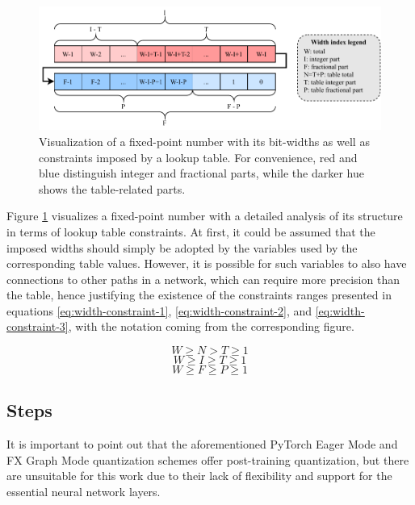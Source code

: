\begin{figure}[hpt!]
  \centering
  \includegraphics[trim={0cm 0cm 0cm 0cm}, width=1.0\textwidth, center]{quantization/width_constraints.pdf}
  \caption{Visualization of a fixed-point number with its bit-widths as well as constraints imposed by a lookup table. For convenience, red and blue distinguish integer and fractional parts, while the darker hue shows the table-related parts.}
  \label{fig:width-constraints}
\end{figure}

Figure \ref{fig:width-constraints} visualizes a fixed-point number with a detailed analysis of its structure in terms of lookup table constraints. At first, it could be assumed that the imposed widths should simply be adopted by the variables used by the corresponding table values. However, it is possible for such variables to also have connections to other paths in a network, which can require more precision than the table, hence justifying the existence of the constraints ranges presented in equations \ref{eq:width-constraint-1}, \ref{eq:width-constraint-2}, and \ref{eq:width-constraint-3}, with the notation coming from the corresponding figure.

\begin{equation} \label{eq:width-constraint-1}
  W \geqslant N > T \geqslant 1
\end{equation}
\begin{equation} \label{eq:width-constraint-2}
  W \geqslant I \geqslant T \geqslant 1
\end{equation}
\begin{equation} \label{eq:width-constraint-3}
  W \geqslant F \geqslant P \geqslant 1
\end{equation}

\subsection{Steps}



It is important to point out that the aforementioned PyTorch Eager Mode and FX Graph Mode quantization schemes offer post-training quantization, but there are unsuitable for this work due to their lack of flexibility and support for the essential neural network layers.

